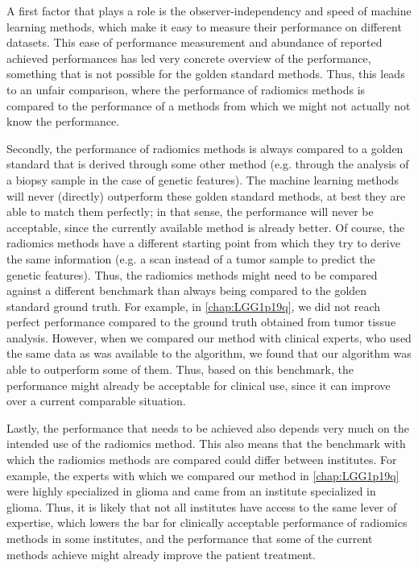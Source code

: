 A first factor that plays a role is the observer-independency and speed of machine learning methods, which make it easy to measure their performance on different datasets.
This ease of performance measurement and abundance of reported achieved performances has led very concrete overview of the performance, something that is not possible for the golden standard methods.
Thus, this leads to an unfair comparison, where the performance of radiomics methods is compared to the performance of a methods from which we might not actually not know the performance.

Secondly, the performance of radiomics methods is always compared to a golden standard that is derived through some other method (e.g. through the analysis of a biopsy sample in the case of genetic features).
The machine learning methods will never (directly) outperform these golden standard methods, at best they are able to match them perfectly; in that sense, the performance will never be acceptable, since the currently available method is already better.
Of course, the radiomics methods have a different starting point from which they try to derive the same information (e.g. a scan instead of a tumor sample to predict the genetic features).
Thus, the radiomics methods might need to be compared against a different benchmark than always being compared to the golden standard ground truth.
For example, in \cref{chap:LGG1p19q}, we did not reach perfect performance compared to the ground truth obtained from tumor tissue analysis.
However, when we compared our method with clinical experts, who used the same data as was available to the algorithm, we found that our algorithm was able to outperform some of them.
Thus, based on this benchmark, the performance might already be acceptable for clinical use, since it can improve over a current comparable situation.

Lastly, the performance that needs to be achieved also depends very much on the intended use of the radiomics method.
This also means that the benchmark with which the radiomics methods are compared could differ between institutes.
For example, the experts with which we compared our method in \cref{chap:LGG1p19q} were highly specialized in glioma and came from an institute specialized in glioma.
Thus, it is likely that not all institutes have access to the same lever of expertise, which lowers the bar for clinically acceptable performance of radiomics methods in some institutes, and the performance that some of the current methods achieve might already improve the patient treatment.

